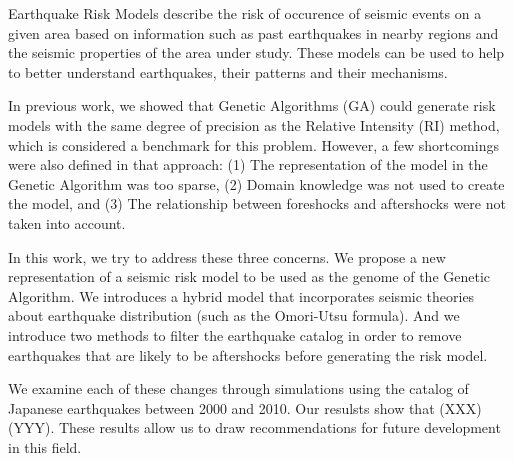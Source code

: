 Earthquake Risk Models describe the risk of occurence of seismic
events on a given area based on information such as past earthquakes
in nearby regions and the seismic properties of the area under study.
These models can be used to help to better understand earthquakes,
their patterns and their mechanisms.

In previous work, we showed that Genetic Algorithms (GA) could
generate risk models with the same degree of precision as the Relative
Intensity (RI) method, which is considered a benchmark for this
problem.  However, a few shortcomings were also defined in that
approach: (1) The representation of the model in the Genetic Algorithm
was too sparse, (2) Domain knowledge was not used to create the model,
and (3) The relationship between foreshocks and aftershocks were not 
taken into account.

In this work, we try to address these three concerns. We propose a new
representation of a seismic risk model to be used as the genome of the
Genetic Algorithm. We introduces a hybrid model that incorporates
seismic theories about earthquake distribution (such as the Omori-Utsu
formula). And we introduce two methods to filter the earthquake catalog 
in order to remove earthquakes that are likely to be aftershocks before
generating the risk model.

We examine each of these changes through simulations using the catalog
of Japanese earthquakes between 2000 and 2010. Our resulsts show that 
(XXX)(YYY). These results allow us to draw recommendations for future 
development in this field.
